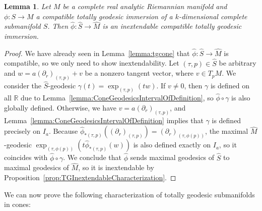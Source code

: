 \documentclass[11pt,a4paper,final]{amsart}
\newcommand{\R}{\mathbb{R}}
\renewcommand{\hat}{\widehat}
\newtheorem{lemma}[theorem]{Lemma}
\theoremstyle{definition}
\begin{document}
\begin{lemma}\label{lemma:ConesOverTGSubmanifolds}
	Let $M$ be a complete real analytic Riemannian manifold and $\phi\colon S\to M$ a compatible totally geodesic immersion of a $k$-dimensional complete submanifold $S$.
	Then $\hat{\phi}\colon\hat{S}\to\hat{M}$ is an inextendable compatible totally geodesic immersion.
\end{lemma}

\begin{proof}
	We have already seen in Lemma~\ref{lemma:tgcone} that $\hat{\phi}\colon \hat{S}\to\hat{M}$ is compatible, so we only need to show inextendability.
	Let $(\tau,p)\in\hat{S}$ be arbitrary and $w= a (\partial_{r})_{(\tau,p)}+v$ be a nonzero tangent vector, where $v\in T_{p}M$.
	We consider the $\hat{S}$-geodesic  $\gamma(t)=\exp_{(\tau,p)}(tw)$.
	If $v\neq 0$, then $\gamma$ is defined on all $\R$ due to Lemma~\ref{lemma:ConeGeodesicsIntervalOfDefinition}, so $\hat{\phi}\circ \gamma$ is also globally defined.
	Otherwise, we have $v=a(\partial_{r})_{(\tau,p)}$, and Lemma~\ref{lemma:ConeGeodesicsIntervalOfDefinition} implies that $\gamma$ is defined precisely on $I_{a}$.
	Because $\hat{\phi}_{*(\tau,p)}((\partial_{r})_{(\tau,p)})=(\partial_{r})_{(\tau,\phi(p))}$, the maximal $\hat{M}$-geodesic $\exp_{(\tau,\phi(p))}(t\hat{\phi}_{*(\tau,p)}(w))$ is also defined exactly on $I_{a}$, so it coincides with $\hat{\phi}\circ \gamma$.
	We conclude that $\hat{\phi}$ sends maximal geodesics of $\hat{S}$ to maximal geodesics of $\hat{M}$, so it is inextendable by Proposition~\ref{prop:TGInextendableCharacterization}. \qedhere
\end{proof}

We can now prove the following characterization of totally geodesic submanifolds in cones:
\end{document}
